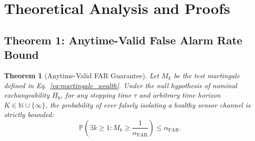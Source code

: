 \documentclass[journal,twocolumn]{IEEEtran}
\newtheorem{theorem}{Theorem}
\newcommand{\Prob}{\mathbb{P}}
\begin{document}
\section{Theoretical Analysis and Proofs}
\label{sec:proofs}



\subsection{Theorem 1: Anytime-Valid False Alarm Rate Bound}
\begin{theorem}[Anytime-Valid FAR Guarantee]
Let $M_k$ be the test martingale defined in Eq.~\eqref{eq:martingale_wealth}. Under the null hypothesis of nominal exchangeability $H_0$, for any stopping time $\tau$ and arbitrary time horizon $K \in \mathbb{N} \cup \{\infty\}$, the probability of ever falsely isolating a healthy sensor channel is strictly bounded:
\begin{equation}
    \Prob\left( \exists k \ge 1 : M_k \ge \frac{1}{\alpha_{\mathrm{FAR}}} \right) \le \alpha_{\mathrm{FAR}}.
\end{equation}
\label{thm:villes_far}
\end{theorem}
\end{document}
